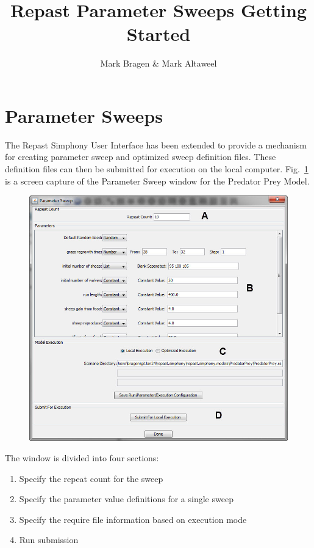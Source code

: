 \documentclass[11pt]{amsart}
\title{Repast Parameter Sweeps Getting Started}
\author{Mark Bragen \& Mark Altaweel}
\begin{document}
 
\maketitle

\section{Parameter Sweeps}
The Repast Simphony User Interface has been extended to provide a mechanism for creating parameter sweep and optimized sweep definition files. These definition files can then be submitted for execution on the local computer. Fig.~\ref{fig:sweep1}  is a screen capture of the Parameter Sweep window for the Predator Prey Model.\\

\begin{figure}[h]
\begin{center}
\vspace{.2in}
\centerline {
\includegraphics{images/Sweep1.jpg}
}
\caption{}
\label{fig:sweep1}
\end{center}
\end{figure}

The window is divided into four sections:
\begin{enumerate}[ (A) ]
\item Specify the repeat count for the sweep
\item Specify the parameter value definitions for a single sweep
\item Specify the require file information based on execution mode
\item Run submission
\end{enumerate}
\vspace{.2in}
\end{document}
